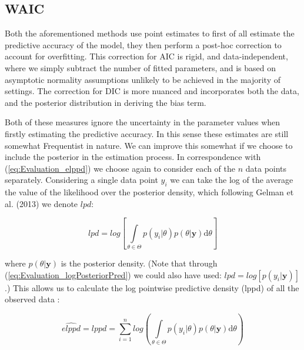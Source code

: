 \documentclass[11pt,fullpage]{book}
\begin{document}
\subsection{WAIC}
Both the aforementioned methods use point estimates to first of all estimate the predictive accuracy of the model, they then perform a post-hoc correction to account for overfitting. This correction for AIC is rigid, and data-independent, where we simply subtract the number of fitted parameters, and is based on asymptotic normality assumptions unlikely to be achieved in the majority of settings. The correction for DIC is more nuanced and incorporates both the data, and the posterior distribution in deriving the bias term. 

Both of these measures ignore the uncertainty in the parameter values when firstly estimating the predictive accuracy. In this sense these estimates are still somewhat Frequentist in nature. We can improve this somewhat if we choose to include the posterior in the estimation process. In correspondence with (\ref{eq:Evaluation_elppd}) we choose again to consider each of the $n$ data points separately. Considering a single data point $y_i$ we can take the log of the average the value of the likelihood over the posterior density, which following Gelman et al. (2013) we denote $lpd$:

\begin{equation}
lpd = log \left[\int\limits_{\theta\in\Theta} p(y_i|\theta)p(\theta|\boldsymbol{y}) \mathrm{d}\theta\right]
\end{equation}

where $p(\theta|\boldsymbol{y})$ is the posterior density. (Note that through (\ref{eq:Evaluation_logPosteriorPred}) we could also have used: $lpd = log\left[p(y_i|\boldsymbol{y})\right]$.) This allows us to calculate the log pointwise predictive density (lppd) of all the observed data \cite{gelman2013bayesian}:

\begin{equation}\label{eq:Evaluation_WAIC}
\widehat{elppd} = lppd = \sum\limits_{i=1}^{n} log\left(\int\limits_{\theta\in\Theta} p(y_i|\theta)p(\theta|\boldsymbol{y})\mathrm{d}\theta\right)
\end{equation}
\end{document}

